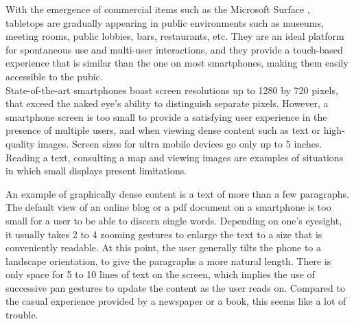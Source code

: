 With the emergence of commercial items such as the Microsoft Surface \citeyearpar{ms}, tabletops are gradually appearing in public environments such as museums, meeting rooms, public lobbies, bars, restaurants, etc.
They are an ideal platform for spontaneous use and multi-user interactions, and they provide a touch-based experience that is similar than the one on most smartphones, making them easily accessible to the pubic.\\
\linebreak
%
%
State-of-the-art smartphones boast screen resolutions up to 1280 by 720 pixels, that exceed the naked eye's ability to distinguish separate pixels.
However, a smartphone screen is too small to provide a satisfying user experience in the presence of multiple users, and when viewing dense content such as text or high-quality images.
Screen sizes for ultra mobile devices go only up to 5 inches.
Reading a text, consulting a map and viewing images are examples of situations in which small displays present limitations.

An example of graphically dense content is a text of more than a few paragraphs.
The default view of an online blog or a pdf document on a smartphone is too small for a user to be able to discern single words.
Depending on one's eyesight, it usually takes 2 to 4 zooming gestures to enlarge the text to a size that is conveniently readable.
At this point, the user generally tilts the phone to a landscape orientation, to give the paragraphs a more natural length.
There is only space for 5 to 10 lines of text on the screen, which implies the use of successive pan gestures to update the content as the user reads on.
Compared to the casual experience provided by a newspaper or a book, this seems like a lot of trouble.

